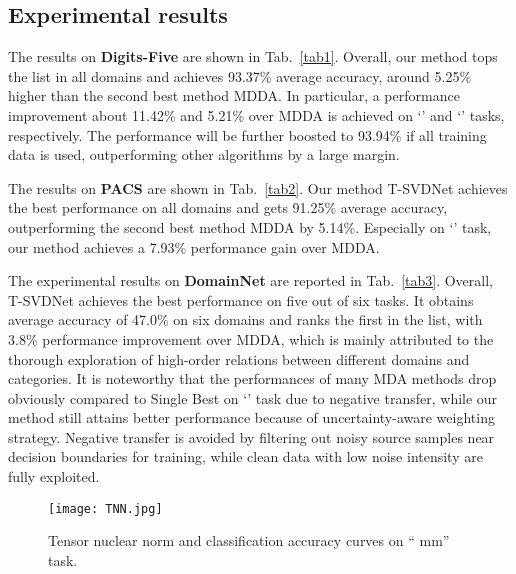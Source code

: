 \documentclass[10pt,twocolumn,letterpaper]{article}
\begin{document}
\subsection{Experimental results}
The results on \textbf{Digits-Five} are shown in Tab.~\ref{tab1}. Overall, our method tops the list in all domains and achieves 93.37\% average accuracy, around 5.25\% higher than the second best method MDDA. In particular, a performance improvement about 11.42\% and 5.21\% over MDDA is achieved on `' and `' tasks, respectively. The performance will be further boosted to 93.94\% if all training data is used, outperforming other algorithms by a large margin.  \par
The results on \textbf{PACS} are shown in Tab.~\ref{tab2}. Our method T-SVDNet achieves the best performance on all domains and gets 91.25\% average accuracy, outperforming the second best method MDDA by 5.14\%. Especially on `' task, our method achieves a 7.93\% performance gain over MDDA. \par
The experimental results on \textbf{DomainNet} are reported in Tab.~\ref{tab3}. Overall, T-SVDNet achieves the best performance on five out of six tasks. It obtains average accuracy of 47.0\% on six domains and ranks the first in the list, with 3.8\% performance improvement over MDDA, which is mainly attributed to the thorough exploration of high-order relations between different domains and categories. It is noteworthy that the performances of many MDA methods drop obviously compared to Single Best on `' task due to negative transfer, while our method still attains better performance because of uncertainty-aware weighting strategy. Negative transfer is avoided by filtering out noisy source samples near decision boundaries for training, while clean data with low noise intensity are fully exploited. \par






\begin{figure}
	\centering
	\texttt{[image: TNN.jpg]}\\
	\caption{Tensor nuclear norm and classification accuracy curves on `` mm'' task. }
	\label{fig6}
	\vspace{-1em}
\end{figure}
\end{document}
